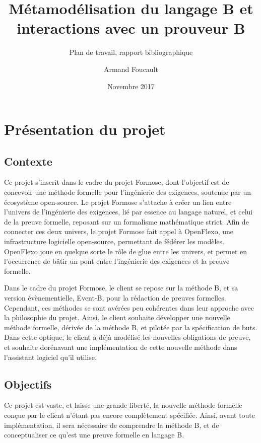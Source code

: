 \documentclass{article}
\author{Armand Foucault}
\date{Novembre 2017}
\title{Métamodélisation du langage B et \mbox{interactions} avec un prouveur B}
\subtitle{Plan de travail, rapport bibliographique}
\begin{document}
\imtaMaketitlepage

\tableofcontents

\newpage


\section{Présentation du projet}

\subsection{Contexte}

Ce projet s'inscrit dans le cadre du projet Formose, dont l'objectif est de concevoir une méthode formelle pour l'ingénierie %
des exigences, soutenue par un écosystème open-source.
Le projet Formose s'attache à créer un lien entre l'univers de l'ingénierie des exigences, lié par essence au langage naturel, %
et celui de la preuve formelle, reposant sur un formalisme mathématique strict.
Afin de connecter ces deux univers, le projet Formose fait appel à OpenFlexo, une infrastructure logicielle open-source, permettant de fédérer les modèles.
OpenFlexo joue en quelque sorte le rôle de glue entre les univers, et permet en l'occurrence de bâtir un pont entre l'ingénierie des exigences et la preuve formelle.

Dans le cadre du projet Formose, le client se repose sur la méthode B, et sa version évènementielle, Event-B, pour la rédaction de preuves formelles.
Cependant, ces méthodes se sont avérées peu cohérentes dans leur approche avec la philosophie du projet.
Ainsi, le client souhaite développer une nouvelle méthode formelle, dérivée de la méthode B, et pilotée par la spécification de buts.
Dans cette optique, le client a déjà modélisé les nouvelles obligations de preuve, et souhaite dorénavant une implémentation de cette nouvelle méthode dans l'assistant logiciel qu'il utilise.

\subsection{Objectifs}

Ce projet est vaste, et laisse une grande liberté, la nouvelle méthode formelle conçue par le client n'étant pas encore complètement spécifiée.
Ainsi, avant toute implémentation, il sera nécessaire de comprendre la méthode B, et de conceptualiser ce qu'est une preuve formelle en langage B.
\end{document}
